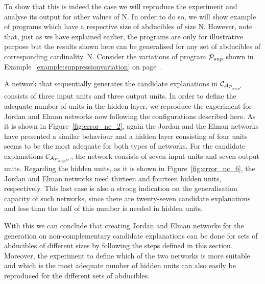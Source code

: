 To show that this is indeed the case we will reproduce the experiment and analyse its output for other values of N. In order to do so, we will show example of programs which have a respective size of abducibles of size N. However, note that, just as we have explained earlier, the programs are only for illustrative purpose but the results shown here can be generalised for any set of abducibles of corresponding cardinality~N. Consider the variations of program $\mathcal{P}_{sup}$ shown in Example~\ref{example:suppressionvariation} on page~\pageref{example:suppressionvariation}.

A network that sequentially generates the candidate explanations in $\mathcal{C}_{\mathcal{A}_{\mathcal{P}_{sup'}}}$ consists of three input units and three output units. In order to define the adequate number of units in the hidden layer, we reproduce the experiment for Jordan and Elman networks now following the configurations described here. As it is shown in Figure~\ref{fig:error_nc_2}, again the Jordan and the Elman networks have presented a similar behaviour and a hidden layer consisting of four units seems to be the most adequate for both types of networks. For the candidate explanations $\mathcal{C}_{\mathcal{A}_{\mathcal{P}_{sup''}}}$, the network consists of seven input units and seven output units. Regarding the hidden units, as it is shown in Figure~\ref{fig:error_nc_6}, the Jordan and Elman networks need thirteen and fourteen hidden units, respectively. This last case is also a strong indication on the generalisation capacity of such networks, since there are twenty-seven candidate explanations and less than the half of this number is needed in hidden units.

With this we can conclude that creating Jordan and Elman networks for the generation on non-complementary candidate explanations can be done for sets of abducibles of different sizes by following the steps defined in this section. Moreover, the experiment to define which of the two networks is more suitable and which is the most adequate number of hidden units can also easily be reproduced for the different sets of abducibles. 

